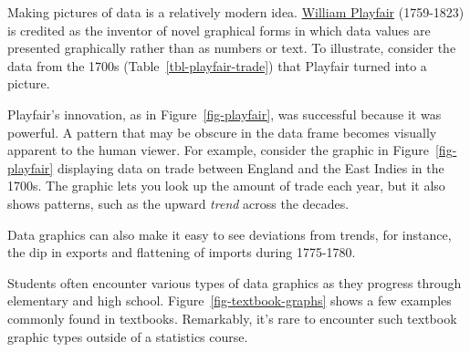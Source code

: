 \documentclass[
  letterpaper,
  DIV=11,
  numbers=noendperiod,
  oneside]{scrartcl}
\begin{document}
Making pictures of data is a relatively modern idea.
\href{https://en.wikipedia.org/wiki/William_Playfair}{William Playfair}
(1759-1823) is credited as the inventor of novel graphical forms in
which data values are presented graphically rather than as numbers or
text. To illustrate, consider the data from the 1700s
(Table~\ref{tbl-playfair-trade}) that Playfair turned into a picture.

Playfair's innovation, as in Figure~\ref{fig-playfair}, was successful
because it was powerful. A pattern that may be obscure in the data frame
becomes visually apparent to the human viewer. For example, consider the
graphic in Figure~\ref{fig-playfair} displaying data on trade between
England and the East Indies in the 1700s. The graphic lets you look up
the amount of trade each year, but it also shows patterns, such as the
upward \emph{trend} across the decades.

Data graphics can also make it easy to see deviations from trends, for
instance, the dip in exports and flattening of imports during 1775-1780.

Students often encounter various types of data graphics as they progress
through elementary and high school. Figure~\ref{fig-textbook-graphs}
shows a few examples commonly found in textbooks. Remarkably, it's rare
to encounter such textbook graphic types outside of a statistics course.
\end{document}
